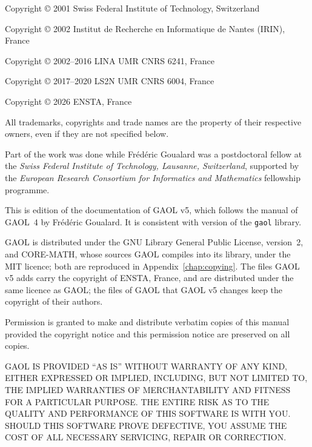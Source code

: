 \begin{copyrighttxt}
Copyright \copyright{} 2001 Swiss Federal Institute of Technology, Switzerland

Copyright \copyright{} 2002 Institut de Recherche en Informatique de Nantes (IRIN), France

Copyright \copyright{} 2002--2016 LINA UMR CNRS 6241, France

Copyright \copyright{} 2017--2020 LS2N UMR CNRS 6004, France

Copyright \copyright{} 2026 ENSTA, France

\medskip
All trademarks, copyrights and trade names are the property of their
respective owners, even if they are not specified below.

Part of the work was done while Fr\'ed\'eric Goualard was a postdoctoral fellow at
the \emph{Swiss Federal Institute of Technology, Lausanne, Switzerland},
supported by the \emph{European Research Consortium for Informatics and
Mathematics} fellowship programme.

This is edition \edition{} of the documentation of GAOL v5, which follows the
manual of GAOL~4 by Fr\'ed\'eric Goualard. It is consistent with version
\version{} of the \texttt{gaol} library.

GAOL is distributed under the GNU Library General Public License, version~2,
and CORE-MATH, whose sources GAOL compiles into its library, under the MIT
licence; both are reproduced in Appendix~\ref{chap:copying}. The files GAOL
v5 adds carry the copyright of ENSTA, France, and are distributed under the
same licence as GAOL; the files of GAOL that GAOL v5 changes keep the
copyright of their authors.

Permission is granted to make and distribute verbatim copies of this manual
provided the copyright notice and this permission notice are preserved on all
copies.

\smallskip
GAOL IS PROVIDED ``AS IS'' WITHOUT WARRANTY OF ANY KIND, EITHER EXPRESSED OR
IMPLIED, INCLUDING, BUT NOT LIMITED TO, THE IMPLIED WARRANTIES OF
MERCHAN\-TA\-BILITY AND FITNESS FOR A PARTICULAR PURPOSE. THE ENTIRE RISK AS
TO THE QUALITY AND PERFORMANCE OF THIS SOFTWARE IS WITH YOU. SHOULD THIS
SOFTWARE PROVE DEFECTIVE, YOU ASSUME THE COST OF ALL NECESSARY SERVICING,
REPAIR OR CORRECTION.
\end{copyrighttxt}
